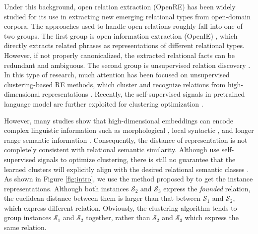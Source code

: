 \documentclass[11pt]{article}
\begin{document}
    Under this background, open relation extraction (OpenRE) has been widely studied for its use in extracting new emerging relational types from open-domain corpora. The approaches used to handle open relations roughly fall into one of two groups. The first group is open information extraction (OpenIE) \citep{10.1145/1409360.1409378,yates-etal-2007-textrunner,fader-etal-2011-identifying}, which directly extracts related phrases as representations of different relational types. However, if not properly canonicalized, the extracted relational facts can be redundant and ambiguous. 
The second group is unsupervised relation discovery \citep{yao-etal-2011-structured,shinyama-sekine-2006-preemptive,simon-etal-2019-unsupervised}.
In this type of research, much attention has been focused on unsupervised clustering-based RE methods, which cluster and recognize relations from high-dimensional representations \citep{10.1007/978-3-319-70407-4_3}. Recently, the self-supervised signals in pretrained language model are further exploited for clustering optimization \citep{hu2020selfore}.

    However, many studies show that high-dimensional embeddings can encode complex linguistic information such as morphological \citep{peters-etal-2018-dissecting}, local syntactic \citep{hewitt-manning-2019-structural}, and longer range semantic information \citep{jawahar-etal-2019-bert}. Consequently, the distance of representation is not completely consistent with relational semantic similarity. Although \citet{hu2020selfore} use self-supervised signals to optimize clustering, there is still no guarantee that the learned clusters will explicitly align with the desired relational semantic classes \citep{10.5555/2968618.2968683}. As shown in Figure \ref{fig:intro}, we use the method proposed by \citet{hu2020selfore} to get the instance representations. Although both instances $\mathcal{S}_2$ and $\mathcal{S}_3$ express the \textit{founded} relation, the euclidean distance between them is larger than that between $\mathcal{S}_1$ and $\mathcal{S}_2$, which express different relation. Obviously, the clustering algorithm tends to group instances $\mathcal{S}_1$ and $\mathcal{S}_2$ together, rather than $\mathcal{S}_2$ and $\mathcal{S}_3$ which express the same relation. 
\end{document}
